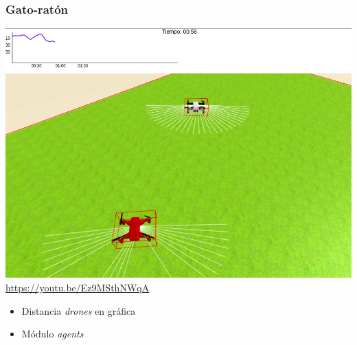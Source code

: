 \documentclass[xcolor={table}]{beamer}
\begin{document}
		\begin{frame}
			\frametitle{Gato-ratón}

		\begin{minipage}{.48\textwidth}	
	         \href{https://youtu.be/Ez9MSthNWqA}{
            \includegraphics[scale=0.18]{img/evaluador_drone.png}}
            \scriptsize{\url{https://youtu.be/Ez9MSthNWqA}}
        \end{minipage}
        \begin{minipage}{.50\textwidth}
      \begin{itemize}
          \begin{itemize}{}\itemsep5pt
              \item Distancia \textit{drones} en gráfica
              \item Módulo \textit{agents} 
          \end{itemize}
       \end{itemize}
    \end{minipage}
		\end{frame}
		
\end{document}
